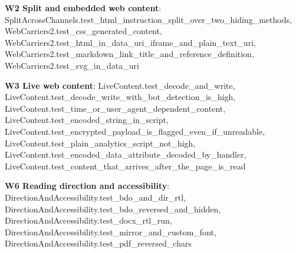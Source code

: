 \documentclass[10pt,a4paper]{article}
\begin{document}
\textbf{W2 Split and embedded web content}: \textcolor{ok}{SplitAcrossChannels.\allowbreak{}test\_\allowbreak{}html\_\allowbreak{}instruction\_\allowbreak{}split\_\allowbreak{}over\_\allowbreak{}two\_\allowbreak{}hiding\_\allowbreak{}methods}, \textcolor{ok}{WebCarriers2.\allowbreak{}test\_\allowbreak{}css\_\allowbreak{}generated\_\allowbreak{}content}, \textcolor{ok}{WebCarriers2.\allowbreak{}test\_\allowbreak{}html\_\allowbreak{}in\_\allowbreak{}data\_\allowbreak{}uri\_\allowbreak{}iframe\_\allowbreak{}and\_\allowbreak{}plain\_\allowbreak{}text\_\allowbreak{}uri}, \textcolor{ok}{WebCarriers2.\allowbreak{}test\_\allowbreak{}markdown\_\allowbreak{}link\_\allowbreak{}title\_\allowbreak{}and\_\allowbreak{}reference\_\allowbreak{}definition}, \textcolor{ok}{WebCarriers2.\allowbreak{}test\_\allowbreak{}svg\_\allowbreak{}in\_\allowbreak{}data\_\allowbreak{}uri}\par
\textbf{W3 Live web content}: \textcolor{ok}{LiveContent.\allowbreak{}test\_\allowbreak{}decode\_\allowbreak{}and\_\allowbreak{}write}, \textcolor{ok}{LiveContent.\allowbreak{}test\_\allowbreak{}decode\_\allowbreak{}write\_\allowbreak{}with\_\allowbreak{}bot\_\allowbreak{}detection\_\allowbreak{}is\_\allowbreak{}high}, \textcolor{ok}{LiveContent.\allowbreak{}test\_\allowbreak{}time\_\allowbreak{}or\_\allowbreak{}user\_\allowbreak{}agent\_\allowbreak{}dependent\_\allowbreak{}content}, \textcolor{ok}{LiveContent.\allowbreak{}test\_\allowbreak{}encoded\_\allowbreak{}string\_\allowbreak{}in\_\allowbreak{}script}, \textcolor{ok}{LiveContent.\allowbreak{}test\_\allowbreak{}encrypted\_\allowbreak{}payload\_\allowbreak{}is\_\allowbreak{}flagged\_\allowbreak{}even\_\allowbreak{}if\_\allowbreak{}unreadable}, \textcolor{ok}{LiveContent.\allowbreak{}test\_\allowbreak{}plain\_\allowbreak{}analytics\_\allowbreak{}script\_\allowbreak{}not\_\allowbreak{}high}, \textcolor{ok}{LiveContent.\allowbreak{}test\_\allowbreak{}encoded\_\allowbreak{}data\_\allowbreak{}attribute\_\allowbreak{}decoded\_\allowbreak{}by\_\allowbreak{}handler}, \textcolor{ok}{LiveContent.\allowbreak{}test\_\allowbreak{}content\_\allowbreak{}that\_\allowbreak{}arrives\_\allowbreak{}after\_\allowbreak{}the\_\allowbreak{}page\_\allowbreak{}is\_\allowbreak{}read}\par
\textbf{W6 Reading direction and accessibility}: \textcolor{ok}{DirectionAndAccessibility.\allowbreak{}test\_\allowbreak{}bdo\_\allowbreak{}and\_\allowbreak{}dir\_\allowbreak{}rtl}, \textcolor{ok}{DirectionAndAccessibility.\allowbreak{}test\_\allowbreak{}bdo\_\allowbreak{}reversed\_\allowbreak{}and\_\allowbreak{}hidden}, \textcolor{ok}{DirectionAndAccessibility.\allowbreak{}test\_\allowbreak{}docx\_\allowbreak{}rtl\_\allowbreak{}run}, \textcolor{ok}{DirectionAndAccessibility.\allowbreak{}test\_\allowbreak{}mirror\_\allowbreak{}and\_\allowbreak{}custom\_\allowbreak{}font}, \textcolor{ok}{DirectionAndAccessibility.\allowbreak{}test\_\allowbreak{}pdf\_\allowbreak{}reversed\_\allowbreak{}chars}\par
\end{document}
